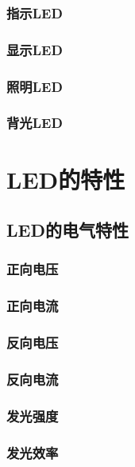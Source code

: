 \documentclass[12pt,UTF8]{ctexbook}
\begin{document}
\subsection{指示LED}

\subsection{显示LED}

\subsection{照明LED}

\subsection{背光LED}

\chapter{LED的特性}

\section{LED的电气特性}

\subsection{正向电压}

\subsection{正向电流}

\subsection{反向电压}

\subsection{反向电流}

\subsection{发光强度}

\subsection{发光效率}
\end{document}
